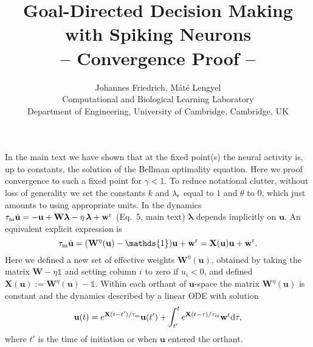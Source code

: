 \documentclass[a4paper,11pt]{article}
\title{\vspace{-10mm}Goal-Directed Decision Making with Spiking Neurons\\
-- Convergence Proof --}
\author{
Johannes Friedrich, M\'at\'e Lengyel%
\\[1ex]
\small Computational and Biological Learning Laboratory\\
\small Department of Engineering, University of Cambridge, Cambridge, UK
}
\newcommand{\vW}{{\mathbf W}}
\newcommand{\vw}{{\mathbf w}}
\newcommand{\vu}{{\mathbf u}}
\newcommand{\vlambda}{{\bm \lambda}}
\newcommand{\vX}{{\mathbf X}}
\newcommand{\rd}{{\mathrm d}}
\begin{document}
\maketitle


In the main text we have shown that at the fixed point(s) the neural activity is, up to constants, the solution of the Bellman optimality equation. Here we proof convergence to such a fixed point for $\gamma<1$.
To reduce notational clutter, without loss of generality we set the constants $k$ and $\lambda_{\rm r}$ equal to $1$ and $\theta$ to $0$, which just amounts to using appropriate units. In the dynamics $\tau_{\rm m} \dot \vu = -\vu + \vW\vlambda-\eta\,\vlambda + \vw^{\rm r}$ (Eq.~5, main text) $\vlambda$ depends implicitly on $\vu$. An equivalent explicit expression is
\begin{equation}
 \tau_{\rm m} \dot \vu =  (\vW^\eta(\vu)-\mathds{1}) \vu + \vw^{\rm r}= \vX(\vu)\vu + \vw^{\rm r}. \label{eq:dynamicA}
\end{equation}
Here we defined a new set of effective weights $\vW^\eta(\vu)$, obtained by taking the matrix $\vW-\eta\mathds{1}$ and setting column $i$ to zero if $u_i<0$, and defined $\vX(\vu):= \vW^\eta(\vu)-\mathds{1}$. Within each orthant of $\vu$-space the matrix $\vW^\eta(\vu)$ is constant and the dynamics described by a linear ODE with solution
\begin{equation}
 \vu(t) = e^{\vX (t-t')/\tau_{\rm m}}\vu(t') + \int_{t'}^t e^{\vX (t-\tau)/\tau_{\rm m}}\vw^{\rm r} \rd\tau,
\end{equation}
where $t'$ is the time of initiation or when $\vu$ entered the orthant. 
\end{document}
